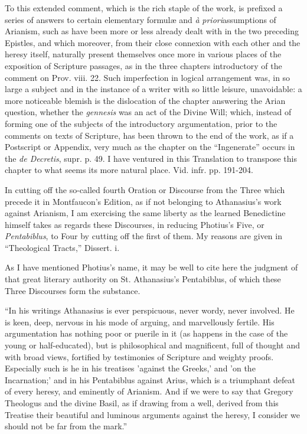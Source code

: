 To this extended comment,
which is the rich staple of the work, is prefixed a series of answers
to certain elementary formulæ and \emph{à} \emph{priori}assumptions
of Arianism, such as have been more or less already dealt with in the
two preceding Epistles, and which moreover, from their close connexion
with each other and the heresy itself, naturally present themselves
once more in various places of the exposition of Scripture passages,
as in the three chapters introductory of the comment on Prov. viii.
22. Such imperfection in logical arrangement was, in so large a
subject and in the instance of a writer with so little leisure,
unavoidable: a more noticeable blemish is the dislocation of the
chapter answering the Arian question, whether the \emph{gennesis} was
an act of the Divine Will; which, instead of forming one of the
subjects of the introductory argumentation, prior to the comments on
texts of Scripture, has been thrown to the end of the work, as if a
Postscript or Appendix, very much as the chapter on the ``Ingenerate''
occurs in the \emph{de Decretis}, supr. p. 49. I have ventured in this
Translation to transpose this chapter to what seems its more natural
place. Vid. infr. pp. 191-204.

In cutting off the so-called
fourth Oration or Discourse from the Three which precede it in
Montfaucon's Edition, as if not belonging to Athanasius's work against
Arianism, I am exercising the same liberty as the learned Benedictine
himself takes as regards these Discourses, in reducing Photius's Five,
or \emph{Pentabiblus}, to Four by cutting off the first of them. My
reasons are given in ``Theological
Tracts,'' Dissert. i.

As I have mentioned Photius's
name, it may be well to cite here the judgment of that great literary
authority on St. Athanasius's Pentabiblus, of which these Three
Discourses form the substance.

``In his writings Athanasius is
ever perspicuous, never wordy, never involved. He is keen, deep,
nervous in his mode of arguing, and marvellously fertile. His
argumentation has nothing poor or puerile in it (as happens in the
case of the young or half-educated), but is philosophical and
magnificent, full of thought and with broad views, fortified by
testimonies of Scripture and weighty proofs. Especially such is he in
his treatises 'against the Greeks,' and 'on the Incarnation;' and in
his Pentabiblus against Arius, which is a triumphant defeat of every
heresy, and eminently of Arianism. And if we were to say that Gregory
Theologus and the divine Basil, as if drawing from a well, derived
from this Treatise their beautiful and luminous arguments against the
heresy, I consider we should not be far from the mark.''

